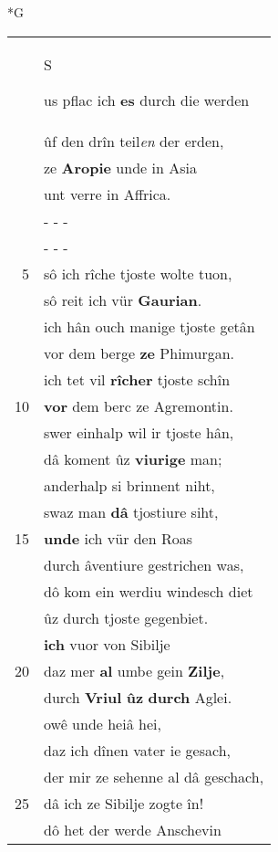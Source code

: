 \documentclass[8pt,a4paper,notitlepage]{article}
\begin{document}
\begin{table}[ht]
\begin{minipage}[t]{0.5\linewidth}
\small
\begin{center}*G
\end{center}
\begin{tabular}{rl}
 & \begin{large}S\end{large}us pflac ich \textbf{es} durch die werden\\ 
 & ûf den drîn teil\textit{en} der erden,\\ 
 & ze \textbf{Aropie} unde in Asia\\ 
 & unt verre in Affrica.\\ 
 & \multicolumn{1}{l}{ - - - }\\ 
 & \multicolumn{1}{l}{ - - - }\\ 
5 & sô ich rîche tjoste wolte tuon,\\ 
 & sô reit ich vür \textbf{Gaurian}.\\ 
 & ich hân ouch manige tjoste getân\\ 
 & vor dem berge \textbf{ze} Phimurgan.\\ 
 & ich tet vil \textbf{rîcher} tjoste schîn\\ 
10 & \textbf{vor} dem berc ze Agremontin.\\ 
 & swer einhalp wil ir tjoste hân,\\ 
 & dâ koment ûz \textbf{viurige} man;\\ 
 & anderhalp si brinnent niht,\\ 
 & swaz man \textbf{dâ} tjostiure siht,\\ 
15 & \textbf{unde} ich vür den Roas\\ 
 & durch âventiure gestrichen was,\\ 
 & dô kom ein werdiu windesch diet\\ 
 & ûz durch tjoste gegenbiet.\\ 
 & \textbf{ich} vuor von Sibilje\\ 
20 & daz mer \textbf{al} umbe gein \textbf{Zilje},\\ 
 & durch \textbf{Vriul} \textbf{ûz} \textbf{durch} Aglei.\\ 
 & owê unde heiâ hei,\\ 
 & daz ich dînen vater ie gesach,\\ 
 & der mir ze sehenne al dâ geschach,\\ 
25 & dâ ich ze Sibilje zogte în!\\ 
 & dô het der werde Anschevin\\ 

\end{tabular}
\end{minipage}
\end{table}
\end{document}
